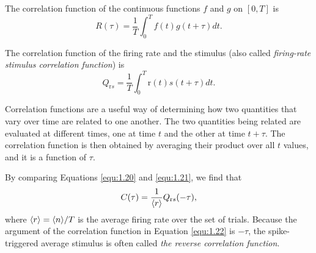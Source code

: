 \begin{defn}
  \label{defn:col-func}
  The correlation function of the continuous functions $f$ and $g$ on $[0, T]$ is
  \begin{equation}
    \label{equ:1.21}
    R(\tau) = \frac{1}{T} \int_0^T f(t) g(t+\tau) dt.
  \end{equation}
\end{defn}
\begin{prop}
  \label{defn:Qrs}
  The correlation function of the firing rate and the stimulus (also called \emph{firing-rate stimulus correlation function}) is
  \begin{equation}
    \label{equ:1.21}
    Q_{\text{r}s} = \frac{1}{T} \int_0^T \text{r}(t) s(t+\tau) dt.
  \end{equation}
\end{prop}
\begin{rem}
  Correlation functions are a useful way of determining how two quantities that vary over time are related to one another. The two quantities being related are evaluated at different times, one at time $t$ and the other at time $t+\tau$. The correlation function is then obtained by averaging their product over all $t$ values, and it is a function of $\tau$.
\end{rem}
\begin{prop}
  \label{prop:rCF}
  By comparing Equations \ref{equ:1.20} and \ref{equ:1.21}, we find that
  \begin{equation}
    \label{equ:1.22}
    C(\tau) = \frac{1}{\langle r \rangle} Q_{\text{r}s}(-\tau),
  \end{equation}
  where $\langle r \rangle = \langle n \rangle/T$ is the average firing rate over the set of trials.
  Because the argument of the correlation function in Equation \ref{equ:1.22} is $-\tau$, the spike-triggered average stimulus is often called \emph{the reverse correlation function}.
\end{prop}

